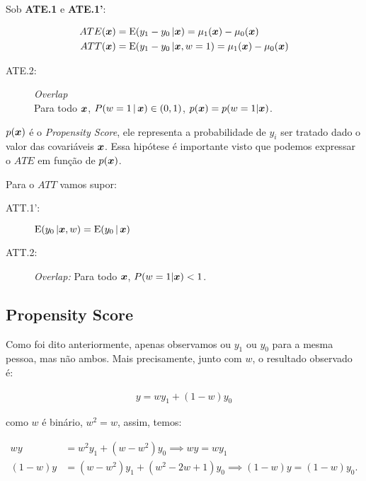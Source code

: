 \documentclass[11pt, oneside, a4paper, article]{article}
\numberwithin{equation}{section}
\begin{document}
\begin{description}
\begin{description}
Sob \textbf{ATE.1} e \textbf{ATE.1'}:

\vspace{-1 em}
\begin{align*}
	ATE( \boldsymbol{x} ) &= \text{E}( y_{1} - y_{0} \, | \boldsymbol{x} ) = \mu_{1}(\boldsymbol{x}) - \mu_{0}(\boldsymbol{x}) 
	\\
	ATT( \boldsymbol{x} ) &= \text{E}( y_{1} - y_{0} \, | \boldsymbol{x}, w=1 ) = \mu_{1}(\boldsymbol{x}) - \mu_{0}(\boldsymbol{x}) 
\end{align*}

\begin{description}
\item[ATE.2:] \textit{Overlap} \\
Para todo $\boldsymbol{x}$, $P(w=1 \, | \, \boldsymbol{x} ) \in ( 0, 1 )$, 
$p(\boldsymbol{x}) = p(w=1 | \boldsymbol{x})$.
\end{description}

$p(\boldsymbol{x})$ é o \textit{Propensity Score}, ele representa a probabilidade de $y_{i}$ ser tratado dado o valor das covariáveis $\boldsymbol{x}$.
Essa hipótese é importante visto que podemos expressar o $ATE$ em função de $p(\boldsymbol{x})$.

\vspace{1 em}
Para o $ATT$ vamos supor:

\begin{description}
\item[ATT.1':] 
	$\text{E}( y_{0} \, | \boldsymbol{x}, w ) = \text{E}( y_{0} \, | \, \boldsymbol{x} )$

\item[ATT.2:] \textit{Overlap:} Para todo $\boldsymbol{x}$, $P(w=1 | \boldsymbol{x} ) < 1$.
\end{description}

\subsection*{Propensity Score}

Como foi dito anteriormente, apenas observamos ou $y_{1}$ ou $y_{0}$ para a mesma pessoa, mas não ambos.
Mais precisamente, junto com $w$, o resultado observado é:

\vspace{-1 em}
\begin{align*}
	y = wy_{1} + (1 - w) y_{0}
\end{align*}

\noindent
como  $w$ é binário, $w^2 = w$, assim, temos:

\vspace{-1 em}
\begin{align*}
w y &= w^{2} y_{1} + (w - w^{2}) y_{0}
\implies
\boxed{w y = w y_{1} }
\\
( 1 - w ) y &= (w - w^{2}) y_{1} + ( w^{2} - 2w + 1 ) y_{0}
\implies
\boxed{( 1 - w ) y = (1 - w) y_{0}}.
\end{align*}


\end{description}
\end{description}
\end{document}
